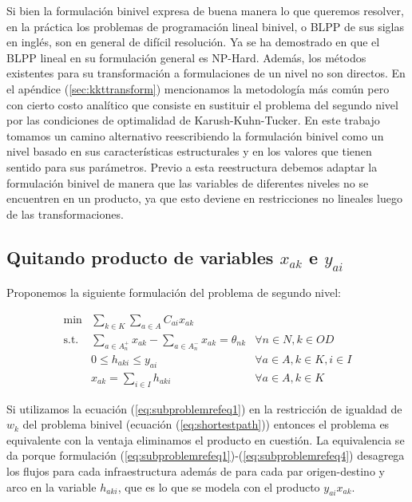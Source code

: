\documentclass{article}
\begin{document}
  Si bien la formulación binivel expresa de buena manera lo que queremos resolver, en la práctica los problemas de programación lineal binivel, o BLPP de sus siglas en inglés, son en general de difícil resolución. Ya se ha demostrado en \cite{bardbook} que el BLPP lineal en su formulación general es NP-Hard. Además, los métodos existentes para su transformación a formulaciones de un nivel no son directos. En el apéndice (\ref{sec:kkttransform}) mencionamos la metodología más común pero con cierto costo analítico que consiste en sustituir el problema del segundo nivel por las condiciones de optimalidad de Karush-Kuhn-Tucker. En este trabajo tomamos un camino alternativo reescribiendo la formulación binivel como un nivel basado en sus características estructurales y en los valores que tienen sentido para sus parámetros. Previo a esta reestructura debemos adaptar la formulación binivel de manera que las variables de diferentes niveles no se encuentren en un producto, ya que esto deviene en restricciones no lineales luego de las transformaciones.

  \subsection{Quitando producto de variables $x_{ak}$ e $y_{ai}$}

  Proponemos la siguiente formulación del problema de segundo nivel:

  \begin{align}
    \text{min}  & \sum_{k \in K} \sum_{a \in A} C_{ai} x_{ak}         & \label{eq:subproblemrefeq1} \\
    \text{s.t.} & \sum_{a \in A_n^+} x_{ak} - \sum_{a \in A_n^-} x_{ak} = \theta_{nk} & \forall n \in N, k \in OD \\
                & 0 \leq h_{aki} \leq y_{ai}                                          & \forall a \in A, k \in K, i \in I \\
                & x_{ak} = \sum_{i \in I} h_{aki}                                     & \forall a \in A, k \in K \label{eq:subproblemrefeq4}
  \end{align}

  Si utilizamos la ecuación (\ref{eq:subproblemrefeq1}) en la restricción de igualdad de $w_k$ del problema binivel (ecuación (\ref{eq:shortestpath})) entonces el problema es equivalente con la ventaja eliminamos el producto en cuestión. La equivalencia se da porque formulación (\ref{eq:subproblemrefeq1})-(\ref{eq:subproblemrefeq4}) desagrega los flujos para cada infraestructura además de para cada par origen-destino y arco en la variable $h_{aki}$, que es lo que se modela con el producto $y_{ai} x_{ak}$.
\end{document}
